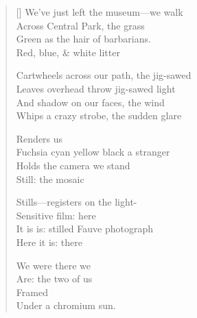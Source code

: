 \label{ch:polaroid}
\settowidth{\versewidth}{Fuchsia   cyan   yellow   black   a stranger}
\begin{verse}[\versewidth]
We've just left the museum---we walk\\
Across Central Park, the grass\\
Green as the hair of barbarians.\\
Red, blue, \& white litter

Cartwheels across our path, the jig-sawed\\
Leaves overhead throw jig-sawed light\\
And shadow on our faces, the wind\\
Whips a crazy strobe, the sudden glare

Renders us\\
Fuchsia   cyan   yellow   black   a stranger\\
Holds the camera     we stand\\
Still: the mosaic

Stills---registers on the light-\\
Sensitive film: here\\
It is is: stilled Fauve photograph\\
Here it is: there

We were there we\\
Are: the two of us\\
Framed\\
Under a chromium sun.
\end{verse}
